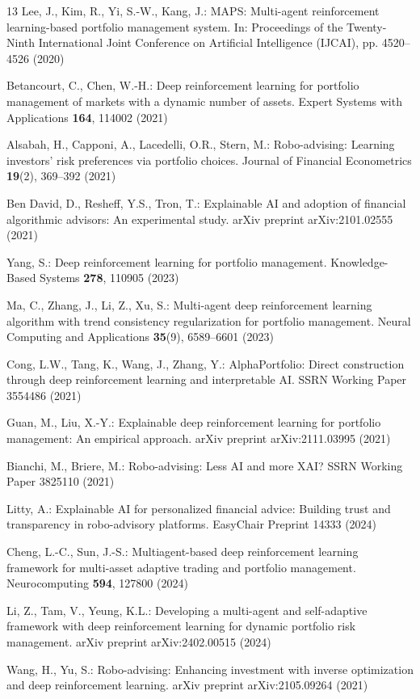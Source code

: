 \documentclass{svproc}
\begin{document}
\begin{thebibliography}{13}
Lee, J., Kim, R., Yi, S.-W., Kang, J.: MAPS: Multi-agent reinforcement learning-based portfolio management system.
In: Proceedings of the Twenty-Ninth International Joint Conference on Artificial Intelligence (IJCAI), pp. 4520--4526 (2020)

Betancourt, C., Chen, W.-H.: Deep reinforcement learning for portfolio management of markets with a dynamic number of assets.
Expert Systems with Applications \textbf{164}, 114002 (2021)

Alsabah, H., Capponi, A., Lacedelli, O.R., Stern, M.: Robo-advising: Learning investors' risk preferences via portfolio choices.
Journal of Financial Econometrics \textbf{19}(2), 369--392 (2021)

Ben David, D., Resheff, Y.S., Tron, T.: Explainable AI and adoption of financial algorithmic advisors: An experimental study.
arXiv preprint arXiv:2101.02555 (2021)

Yang, S.: Deep reinforcement learning for portfolio management.
Knowledge-Based Systems \textbf{278}, 110905 (2023)

Ma, C., Zhang, J., Li, Z., Xu, S.: Multi-agent deep reinforcement learning algorithm with trend consistency regularization for portfolio management.
Neural Computing and Applications \textbf{35}(9), 6589--6601 (2023)

Cong, L.W., Tang, K., Wang, J., Zhang, Y.: AlphaPortfolio: Direct construction through deep reinforcement learning and interpretable AI.
SSRN Working Paper 3554486 (2021)

Guan, M., Liu, X.-Y.: Explainable deep reinforcement learning for portfolio management: An empirical approach.
arXiv preprint arXiv:2111.03995 (2021)

Bianchi, M., Briere, M.: Robo-advising: Less AI and more XAI?
SSRN Working Paper 3825110 (2021)

Litty, A.: Explainable AI for personalized financial advice: Building trust and transparency in robo-advisory platforms.
EasyChair Preprint 14333 (2024)

Cheng, L.-C., Sun, J.-S.: Multiagent-based deep reinforcement learning framework for multi-asset adaptive trading and portfolio management.
Neurocomputing \textbf{594}, 127800 (2024)

Li, Z., Tam, V., Yeung, K.L.: Developing a multi-agent and self-adaptive framework with deep reinforcement learning for dynamic portfolio risk management.
arXiv preprint arXiv:2402.00515 (2024)

Wang, H., Yu, S.: Robo-advising: Enhancing investment with inverse optimization and deep reinforcement learning.
arXiv preprint arXiv:2105.09264 (2021)

\end{thebibliography}
\end{document}
